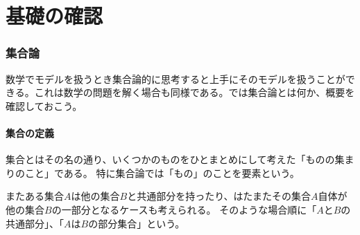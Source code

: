 \documentclass[a4j, 9pt]{ltjsarticle}
\def\ds{\displaystyle}
\begin{document}
\tableofcontents
\clearpage

\part{基礎の確認}

  \section{集合論}
    数学でモデルを扱うとき集合論的に思考すると上手にそのモデルを扱うことができる。これは数学の問題を解く場合も同様である。では集合論とは何か、概要を確認しておこう。
    \begin{multicols}{2} %

      \subsection{集合の定義}
        集合とはその名の通り、いくつかのものをひとまとめにして考えた「ものの集まりのこと」である。
        特に集合論では「もの」のことを要素という。\par
        またある集合$\ds A$は他の集合$\ds B$と共通部分を持ったり、はたまたその集合$\ds A$自体が他の集合$\ds B$の一部分となるケースも考えられる。
        そのような場合順に「$\ds AとB$の共通部分」、「$\ds AはBの$部分集合」という。

\end{multicols}
\end{document}
